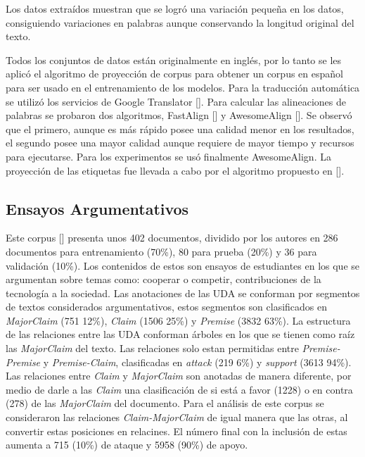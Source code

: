 Los datos extraídos muestran que se logró una variación pequeña en los datos, consiguiendo variaciones en palabras aunque conservando la 
longitud original del texto.

Todos los conjuntos de datos están originalmente en inglés, por lo tanto se les aplicó el algoritmo de proyección
de corpus para obtener un corpus en español para ser usado en el entrenamiento de los modelos. 
Para la traducción automática se utilizó los servicios de Google Translator [\cite{translateGoogle}]. Para calcular las 
alineaciones de palabras se probaron dos algoritmos, FastAlign [\cite{dyer2013fastalign}] y AwesomeAlign 
[\cite{dou2021word}]. Se observó que el primero, aunque es más rápido posee una calidad menor en los resultados,
el segundo posee una mayor calidad aunque requiere de mayor tiempo y recursos para ejecutarse. Para los experimentos
se usó finalmente AwesomeAlign. La proyección de las etiquetas fue llevada a cabo por el algoritmo propuesto 
en [\cite{eger2018cross}].

\subsection{Ensayos Argumentativos}\label{corpus:persuasive_essays}

Este corpus [\cite{stab2017parsing}] presenta unos 402 documentos, dividido por los autores en 286 documentos para entrenamiento (70\%), 
80 para prueba (20\%) y 36 para validación (10\%). Los contenidos de estos son ensayos de estudiantes en los que 
se argumentan sobre temas como: cooperar o competir, contribuciones de la tecnología a la sociedad.
Las anotaciones de las UDA se conforman por segmentos de textos considerados argumentativos, estos segmentos son 
clasificados en \emph{MajorClaim} (751 12\%), \emph{Claim} (1506 25\%) y \emph{Premise} (3832 63\%).
La estructura de las relaciones entre las UDA conforman árboles en los que se tienen como raíz las 
\emph{MajorClaim} del texto. Las relaciones solo estan permitidas entre \emph{Premise-Premise} y \emph{Premise-Claim}, clasificadas
en \emph{attack} (219 6\%) y \emph{support} (3613 94\%). Las relaciones entre \emph{Claim} y \emph{MajorClaim} son anotadas de manera diferente, por medio de 
darle a las \emph{Claim} una clasificación de si está a favor (1228) o en contra (278) de las \emph{MajorClaim} del documento.
Para el análisis de este corpus se consideraron las relaciones \emph{Claim-MajorClaim} de igual manera que las otras,
al convertir estas posiciones en relacines. El número final con la inclusión de estas aumenta a 715 (10\%) de ataque y 
5958 (90\%) de apoyo.

